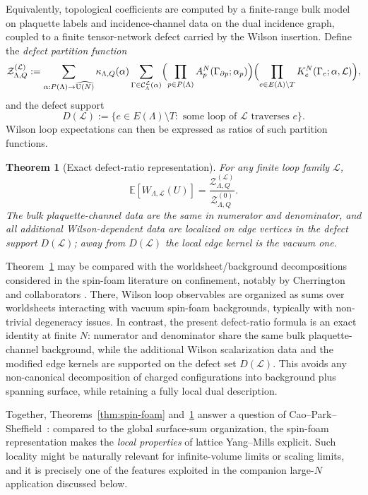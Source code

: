 \documentclass[11pt,a4paper,reqno]{article}
\newtheorem{theorem}{Theorem}[section]
\theoremstyle{definition}
\theoremstyle{remark}
\newcommand\U{{\mathrm U}}
\newcommand\Lc{{\mathcal{L}}}
\begin{document}
Equivalently, topological coefficients are computed by a finite-range bulk model on plaquette labels and incidence-channel data on the dual incidence graph, coupled to a finite tensor-network defect carried by the Wilson insertion. Define the \emph{defect partition function}
\begin{equation}\label{eq:defect-pf}
\mathcal{Z}_{\Lambda,Q}^{(\Lc)}:=\sum_{\alpha:P(\Lambda)\to \widehat{\U(N)}}\kappa_{\Lambda,Q}(\alpha)
\sum_{\Gamma\in \mathcal C^\Lc_\Lambda(\alpha)}\Bigl(
\prod_{p\in P(\Lambda)}A_p^N(\Gamma_{\partial p};\alpha_p)\Bigr)\Bigl(\prod_{e\in E(\Lambda)\setminus T}K_e^N(\Gamma_e;\alpha,\Lc)\Bigr),
\end{equation}
and the defect support
\[
D(\Lc):=\{e\in E(\Lambda)\setminus T:\text{ some loop of }\Lc\text{ traverses }e\}.
\]
Wilson loop expectations can then be expressed as ratios of such partition functions.

\begin{theorem}[Exact defect-ratio representation]\label{thm:spin-foam2}
For any finite loop family $\Lc$,
\begin{equation}
\mathbb E[W_{\Lambda,\Lc}(U)]=\frac{\mathcal{Z}_{\Lambda,Q}^{(\Lc)}}{\mathcal{Z}_{\Lambda,Q}^{(0)}}.
\end{equation}
The bulk plaquette-channel data are the same in numerator and denominator, and all additional Wilson-dependent data are localized on edge vertices in the defect support $D(\Lc)$; away from $D(\Lc)$ the local edge kernel is the vacuum one.
\end{theorem}

Theorem~\ref{thm:spin-foam2} may be compared with the worldsheet/background decompositions considered in the spin-foam literature on confinement, notably by Cherrington and collaborators \cite{CCK07}. There, Wilson loop observables are organized as sums over worldsheets interacting with vacuum spin-foam backgrounds, typically with non-trivial degeneracy issues. In contrast, the present defect-ratio formula is an exact identity at finite $N$: numerator and denominator share the same bulk plaquette-channel background, while the additional Wilson scalarization data and the modified edge kernels are supported on the defect set $D(\Lc)$. This avoids any non-canonical decomposition of charged configurations into background plus spanning surface, while retaining a fully local dual description.

Together, Theorems~\ref{thm:spin-foam} and~\ref{thm:spin-foam2} answer a question of Cao--Park--Sheffield~\cite[\S 7, (16)]{CPS25}: compared to the global surface-sum organization, the spin-foam representation makes the \emph{local properties} of lattice Yang--Mills explicit. Such locality might be naturally relevant for infinite-volume limits or scaling limits, and it is precisely one of the features exploited in the companion large-$N$ application discussed below.
\end{document}

